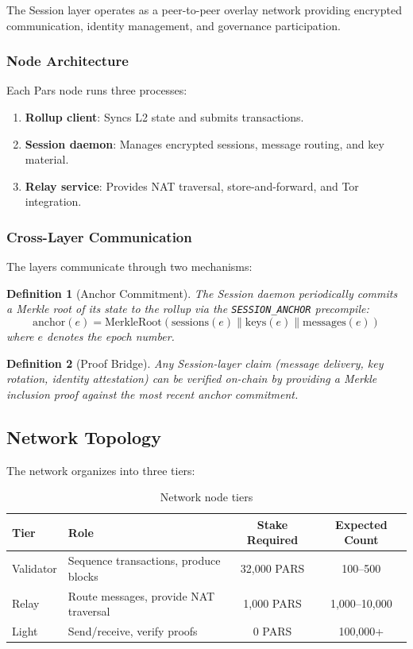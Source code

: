 \documentclass[11pt,a4paper]{article}
\newtheorem{definition}{Definition}
\begin{document}
The Session layer operates as a peer-to-peer overlay network providing encrypted communication, identity management, and governance participation.

\subsubsection{Node Architecture}

Each Pars node runs three processes:

\begin{enumerate}
    \item \textbf{Rollup client}: Syncs L2 state and submits transactions.
    \item \textbf{Session daemon}: Manages encrypted sessions, message routing, and key material.
    \item \textbf{Relay service}: Provides NAT traversal, store-and-forward, and Tor integration.
\end{enumerate}

\subsubsection{Cross-Layer Communication}

The layers communicate through two mechanisms:

\begin{definition}[Anchor Commitment]
The Session daemon periodically commits a Merkle root of its state to the rollup via the \texttt{SESSION\_ANCHOR} precompile:
\[
\text{anchor}(e) = \text{MerkleRoot}(\text{sessions}(e) \| \text{keys}(e) \| \text{messages}(e))
\]
where $e$ denotes the epoch number.
\end{definition}

\begin{definition}[Proof Bridge]
Any Session-layer claim (message delivery, key rotation, identity attestation) can be verified on-chain by providing a Merkle inclusion proof against the most recent anchor commitment.
\end{definition}

\subsection{Network Topology}

The network organizes into three tiers:

\begin{table}[H]
\centering
\caption{Network node tiers}
\label{tab:node_tiers}
\begin{tabularx}{\textwidth}{lXcc}
\toprule
\textbf{Tier} & \textbf{Role} & \textbf{Stake Required} & \textbf{Expected Count} \\
\midrule
Validator & Sequence transactions, produce blocks & 32{,}000 PARS & 100--500 \\
Relay & Route messages, provide NAT traversal & 1{,}000 PARS & 1{,}000--10{,}000 \\
Light & Send/receive, verify proofs & 0 PARS & 100{,}000+ \\
\bottomrule
\end{tabularx}
\end{table}
\end{document}
